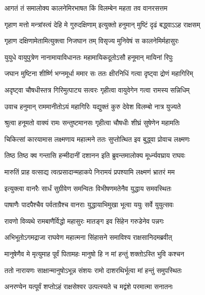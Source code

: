 \twolineshloka
{आगतं तं समालोक्य कालनेमिरभाषत}
{किं विलम्बेन महता तव वानरसत्तम} %

\twolineshloka
{गृहाण मत्तो मन्त्रांस्त्वं देहि मे गुरुदक्षिणाम्}
{इत्युक्तो हनुमान् मुष्टिं दृढं बद्\mbox{}ध्वाऽऽह राक्षसम्} %

\twolineshloka
{गृहाण दक्षिणामेतामित्युक्त्वा निजघान तम्}
{विसृज्य मुनिवेषं स कालनेमिर्महासुरः} %

\twolineshloka
{युयुधे वायुपुत्रेण नानामायाविधानतः}
{महामायिकदूतोऽसौ हनूमान् मायिनां रिपुः} %

\twolineshloka
{जघान मुष्टिना शीर्ष्णि भग्नमूर्धा ममार सः}
{ततः क्षीरनिधिं गत्वा दृष्ट्वा द्रोणं महागिरिम्} %

\twolineshloka
{अदृष्ट्वा चौषधीस्तत्र गिरिमुत्पाट्य सत्वरः}
{गृहीत्वा वायुवेगेन गत्वा रामस्य सन्निधिम्} %

\twolineshloka
{उवाच हनुमान् राममानीतोऽयं महागिरिः}
{यद्युक्तं कुरु देवेश विलम्बो नात्र युज्यते} %

\twolineshloka
{श्रुत्वा हनूमतो वाक्यं रामः सन्तुष्टमानसः}
{गृहीत्वा चौषधीः शीघ्रं सुषेणेन महामतिः} %

\twolineshloka
{चिकित्सां कारयामास लक्ष्मणाय महात्मने}
{ततः सुप्तोत्थित इव बुद्ध्वा प्रोवाच लक्ष्मणः} %

\twolineshloka
{तिष्ठ तिष्ठ क्व गन्तासि हन्मीदानीं दशानन}
{इति ब्रुवन्तमालोक्य मूर्ध्न्यवघ्राय राघवः} %

\twolineshloka
{मारुतिं प्राह वत्साद्य त्वत्प्रसादान्महाकपे}
{निरामयं प्रपश्यामि लक्ष्मणं भ्रातरं मम} %

\twolineshloka
{इत्युक्त्वा वानरैः सार्धं सुग्रीवेण समन्वितः}
{विभीषणमतेनैव युद्धाय समवस्थितः} %

\twolineshloka
{पाषाणैः पादपैश्चैव पर्वताग्रैश्च वानराः}
{युद्धायाभिमुखा भूत्वा ययुः सर्वे युयुत्सवः} %

\twolineshloka
{रावणो विव्यथे रामबाणैर्विद्धो महासुरः}
{मातङ्ग इव सिंहेन गरुडेनेव पन्नगः} %

\twolineshloka
{अभिभूतोऽगमद्राजा राघवेण महात्मना}
{सिंहासने समाविश्य राक्षसानिदमब्रवीत्} %

\twolineshloka
{मानुषेणैव मे मृत्युमाह पूर्वं पितामहः}
{मानुषो हि न मां हन्तुं शक्तोऽस्ति भुवि कश्चन} %

\twolineshloka
{ततो नारायणः साक्षान्मानुषोऽभून्न संशयः}
{रामो दाशरथिर्भूत्वा मां हन्तुं समुपस्थितः} %

\twolineshloka
{अनरण्येन यत्पूर्वं शप्तोऽहं राक्षसेश्वर}
{उत्पत्स्यते च मद्वंशे परमात्मा सनातनः} %

